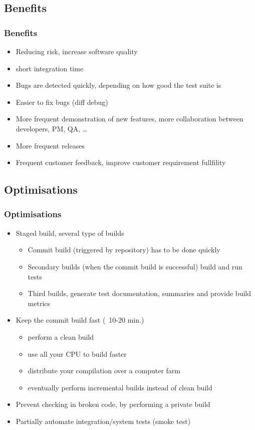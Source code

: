\documentclass[handout]{beamer}
\begin{document}
\subsection[Benefits]{Benefits}
\begin{frame}
\frametitle{Benefits}
\begin{itemize}
	\item<1-> Reducing risk, increase software quality 
    \item<2-> short integration time 
    \item<3-> Bugs are detected quickly, depending on how good the test suite
    is\cite{Duvall07}
    \item<4-> Easier to fix bugs (diff debug)
    \item<5-> More frequent demonstration of new features, more collaboration
    between developers, PM, QA, \ldots
    \item<6-> More frequent releases
    \item<7-> Frequent customer feedback, improve customer requirement
    fullfility
\end{itemize}
\end{frame}

\subsection[Optimisations]{Optimisations}

\begin{frame}
\frametitle{Optimisations}
\begin{itemize}
	\item<1-> Staged build, several type of builds\cite{Fowler06}
		\begin{itemize}
          \item<2-> Commit build (triggered by repository) has to be done
          quickly
          \item<3-> Secondary builds (when the commit build is successful) build
          and run tests
          \item<4-> Third builds, generate test documentation, summaries and
          provide build metrics\cite{Duvall07}
        \end{itemize}
    \item<5-> Keep the commit build fast\cite{Duvall07} (~10-20 min.)
    \begin{itemize}
      \item perform a clean build
      \item use all your CPU to build faster
      \item distribute your compilation over a computer farm\cite{Pool09}
      \item eventually perform incremental builds instead of clean build
    \end{itemize}
    \item<6-> Prevent checking in broken code, by performing a private
    build\cite{Duvall07}
    \item<7-> Partially automate integration/system tests (smoke
    test)\cite{Berczuk03}
\end{itemize}
\end{frame}
\end{document}
